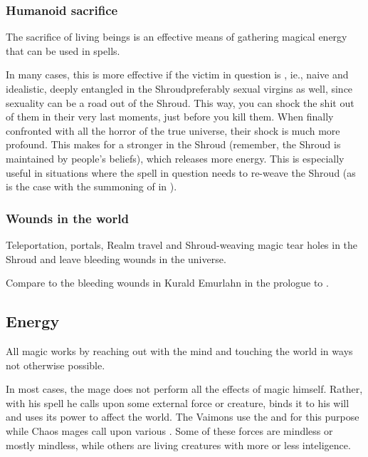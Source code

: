 \subsubsection{Humanoid sacrifice}
The sacrifice of living beings is an effective means of gathering magical energy that can be used in spells. 

In many cases, this is more effective if the victim in question is , ie., naive and idealistic, deeply entangled in the Shroud\dash preferably sexual virgins as well, since sexuality can be a road out of the Shroud. 
This way, you can shock the shit out of them in their very last moments, just before you kill them. When finally confronted with all the horror of the true universe, their shock is much more profound. 
This makes for a stronger  in the Shroud (remember, the Shroud is maintained by people's beliefs), which releases more energy. 
This is especially useful in situations where the spell in question needs to re-weave the Shroud (as is the case with the summoning of  in \TwilightAngelRememberEmph).





\subsubsection{Wounds in the world}
Teleportation, portals, Realm travel and Shroud-weaving magic tear holes in the Shroud and leave bleeding wounds in the universe. 

Compare to the bleeding wounds in Kurald Emurlahn in the prologue to \MalazanReapersGale.










\subsection{Energy}
All magic works by reaching out with the mind and touching the world in ways not otherwise possible. 

In most cases, the mage does not perform all the effects of magic himself. 
Rather, with his spell he calls upon some external force or creature, binds it to his will and uses its power to affect the world. 
The Vaimons use the \Sephiroth{} and \Kliffoth{} for this purpose while Chaos mages call upon various . 
Some of these forces are mindless or mostly mindless, while others are living creatures with more or less inteligence.

